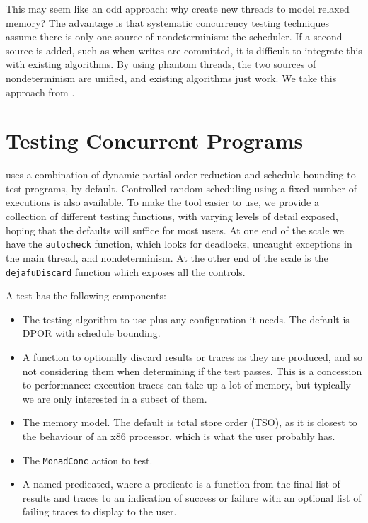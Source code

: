 This may seem like an odd approach: why create new threads to model relaxed
memory?  The advantage is that systematic concurrency testing techniques assume
there is only one source of nondeterminism: the scheduler.  If a second source
is added, such as when writes are committed, it is difficult to integrate this
with existing algorithms.  By using phantom threads, the two sources of
nondeterminism are unified, and existing algorithms just work.  We take this
approach from \cite{zhang2015}.

\section{Testing Concurrent Programs}
\label{sec:dejafu-testing}

\dejafu{} uses a combination of dynamic partial-order reduction and
schedule bounding to test programs, by default.  Controlled random
scheduling using a fixed number of executions is also available.  To
make the tool easier to use, we provide a collection of different
testing functions, with varying levels of detail exposed, hoping that
the defaults will suffice for most users.  At one end of the scale we
have the \verb|autocheck| function, which looks for deadlocks,
uncaught exceptions in the main thread, and nondeterminism.  At the
other end of the scale is the \verb|dejafuDiscard| function which
exposes all the controls.

A \dejafu{} test has the following components:

\begin{itemize}
\item The testing algorithm to use plus any configuration it needs.
  The default is DPOR with schedule bounding.
\item A function to optionally discard results or traces as they are
  produced, and so not considering them when determining if the test
  passes.  This is a concession to performance: execution traces can
  take up a lot of memory, but typically we are only interested in a
  subset of them.
\item The memory model.  The default is total store order (TSO), as it
  is closest to the behaviour of an x86 processor\cite{owens2009},
  which is what the user probably has.
\item The \verb|MonadConc| action to test.
\item A named predicated, where a predicate is a function from the
  final list of results and traces to an indication of success or
  failure with an optional list of failing traces to display to the
  user.
\end{itemize}

